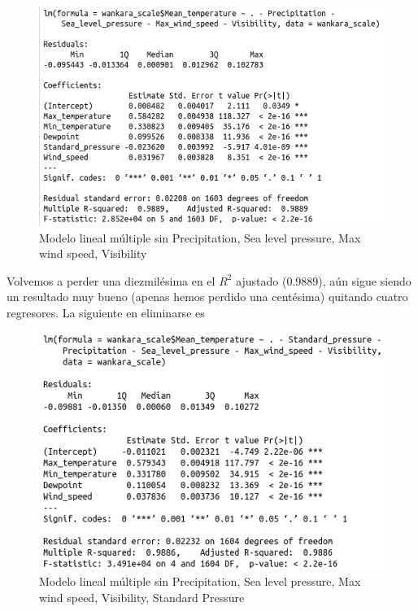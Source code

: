 \begin{figure}[H] %
	\centering
	\includegraphics[scale=0.6]{mlm5.png}  %
	\caption{Modelo lineal múltiple sin Precipitation, Sea level pressure, Max wind speed, Visibility} 
	\label{fig:mlm5}
\end{figure}

Volvemos a perder una diezmilésima en el $R^2$ ajustado (0.9889), aún sigue siendo un resultado muy bueno (apenas hemos perdido una centésima) quitando cuatro regresores. La siguiente en eliminarse es

\begin{figure}[H] %
	\centering
	\includegraphics[scale=0.6]{mlm6.png}  %
	\caption{Modelo lineal múltiple sin Precipitation, Sea level pressure, Max wind speed, Visibility, Standard Pressure} 
	\label{fig:mlm6}
\end{figure}


